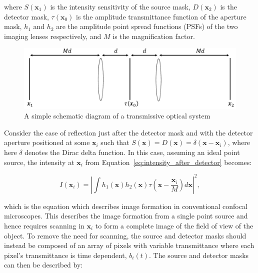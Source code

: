 where $S\left(\textbf{x}_{1}\right)$ is the intensity 
sensitivity of the source mask, $D\left(\textbf{x}_{2}\right)$ 
is the detector mask, $\tau\left(\textbf{x}_{0}\right)$ is 
the amplitude transmittance function of the aperture mask, 
$h_{1}$ and $h_{2}$ are the amplitude point spread functions 
(PSFs) of the two imaging lenses respectively, and $M$ is the 
magnification factor. 

\begin{figure}[h]
	\centering
	\includegraphics[width=\textwidth]{images/optical_system_schematic.jpg}
	\caption[A simple schematic diagram of a transmissive optical system]{A simple schematic diagram of a transmissive optical system}
	\label{fig:optical_system_schematic}
\end{figure}

Consider the case of reflection just after the detector mask 
and with the detector aperture positioned at some 
$\textbf{x}_{i}$ such that $S\left(\textbf{x}\right) = 
D\left(\textbf{x}\right) = \delta\left(\textbf{x} - 
\textbf{x}_{i}\right)$, where here $\delta$ denotes the Dirac 
delta function. In this case, assuming an ideal point source, 
the intensity at $\textbf{x}_{i}$ from 
Equation~\ref{eq:intensity_after_detector} becomes:

\begin{equation}\label{eq:confocal_image_form}
I\left(\textbf{x}_{i}\right) = \left| \int h_{1}\left(\textbf{x}\right) h_{2}\left(\textbf{x}\right) \tau\left(\textbf{x} - \frac{\textbf{x}_{i}}{M}\right)d\textbf{x}\right|^{2},
\end{equation}

which is the equation which describes image formation in 
conventional confocal microscopes\cite{wilson1990confocal}.
This describes the image formation from a single point source 
and hence requires scanning in $\textbf{x}_{i}$ to form a 
complete image of the field of view of the object. To remove 
the need for scanning, the source and detector masks should 
instead be composed of an array of pixels with variable 
transmittance where each pixel's transmittance is time 
dependent, $b_{i}\left(t\right)$. The source and detector 
masks can then be described by:

